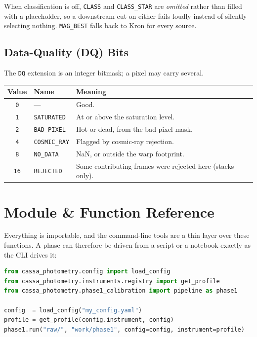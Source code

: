 \documentclass[11pt,a4paper]{article}
\begin{document}
When classification is off, \texttt{CLASS} and \texttt{CLASS\_STAR} are
\emph{omitted} rather than filled with a placeholder, so a downstream cut on
either fails loudly instead of silently selecting nothing. \texttt{MAG\_BEST}
falls back to Kron for every source.

\subsection{Data-Quality (DQ) Bits}
The \texttt{DQ} extension is an integer bitmask; a pixel may carry several.

\begin{center}
\begin{tabularx}{\textwidth}{|c|l|X|}
\hline
\textbf{Value} & \textbf{Name} & \textbf{Meaning} \\
\hline
\texttt{0} & --- & Good. \\
\hline
\texttt{1} & \texttt{SATURATED} & At or above the saturation level. \\
\hline
\texttt{2} & \texttt{BAD\_PIXEL} & Hot or dead, from the bad-pixel mask. \\
\hline
\texttt{4} & \texttt{COSMIC\_RAY} & Flagged by cosmic-ray rejection. \\
\hline
\texttt{8} & \texttt{NO\_DATA} & NaN, or outside the warp footprint. \\
\hline
\texttt{16} & \texttt{REJECTED} & Some contributing frames were rejected here (stacks only). \\
\hline
\end{tabularx}
\end{center}

\section{Module \& Function Reference}
Everything is importable, and the command-line tools are a thin layer over these
functions. A phase can therefore be driven from a script or a notebook exactly
as the CLI drives it:

\begin{lstlisting}[language=Python]
from cassa_photometry.config import load_config
from cassa_photometry.instruments.registry import get_profile
from cassa_photometry.phase1_calibration import pipeline as phase1

config  = load_config("my_config.yaml")
profile = get_profile(config.instrument, config)
phase1.run("raw/", "work/phase1", config=config, instrument=profile)
\end{lstlisting}
\end{document}
